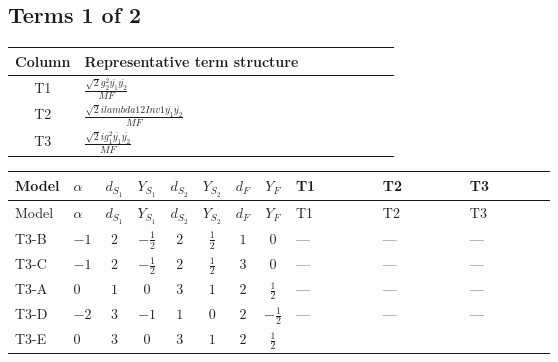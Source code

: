 \documentclass[8pt]{article}
\begin{document}
\begin{landscape}
\subsection*{Terms 1 of 2}
\begin{center}
\begin{tabular}{@{}c >{\raggedright\arraybackslash}p{0.82\linewidth}@{}}
\toprule
Column & Representative term structure \\
\midrule
T1 & \(\displaystyle \frac{\sqrt{2} g_{2}^{2} \overline{y_{1}} \overline{y_{2}}}{MF}\) \\
\midrule
T2 & \(\displaystyle \frac{\sqrt{2} i lambda12Inv1 \overline{y_{1}} \overline{y_{2}}}{MF}\) \\
\midrule
T3 & \(\displaystyle \frac{\sqrt{2} i g_{1}^{2} \overline{y_{1}} \overline{y_{2}}}{MF}\) \\
\midrule
\bottomrule
\end{tabular}
\end{center}
\smallskip
\tiny
\begin{longtable}{@{}llcccccc >{\raggedright\arraybackslash}p{0.21\linewidth} >{\raggedright\arraybackslash}p{0.21\linewidth} >{\raggedright\arraybackslash}p{0.21\linewidth}@{}}
\toprule
Model & $\alpha$ & $d_{S_1}$ & $Y_{S_1}$ & $d_{S_2}$ & $Y_{S_2}$ & $d_F$ & $Y_F$ & T1 & T2 & T3 \\
\midrule
\endfirsthead
\toprule
Model & $\alpha$ & $d_{S_1}$ & $Y_{S_1}$ & $d_{S_2}$ & $Y_{S_2}$ & $d_F$ & $Y_F$ & T1 & T2 & T3 \\
\midrule
\endhead
T3-B & $-1$ & $2$ & $-\frac{1}{2}$ & $2$ & $\frac{1}{2}$ & $1$ & $0$ & --- & --- & --- \\
\midrule
T3-C & $-1$ & $2$ & $-\frac{1}{2}$ & $2$ & $\frac{1}{2}$ & $3$ & $0$ & --- & --- & --- \\
\midrule
T3-A & $0$ & $1$ & $0$ & $3$ & $1$ & $2$ & $\frac{1}{2}$ & --- & --- & --- \\
\midrule
T3-D & $-2$ & $3$ & $-1$ & $1$ & $0$ & $2$ & $-\frac{1}{2}$ & --- & --- & --- \\
\midrule
T3-E & $0$ & $3$ & $0$ & $3$ & $1$ & $2$ & $\frac{1}{2}$ & \scriptsize\adjustbox{max width=\linewidth}{$\begin{gathered} \frac{\sqrt{2} g_{2}^{2} \overline{y_{1}} \overline{y_{2}}}{4 MF}\end{gathered}$} & \scriptsize\adjustbox{max width=\linewidth}{$\begin{gathered} - \frac{\sqrt{2} i lambda12Inv1 \overline{y_{1}} \overline{y_{2}}}{4 MF}\end{gathered}$} & \scriptsize\adjustbox{max width=\linewidth}{$\begin{gathered} \frac{3 \sqrt{2} i g_{1}^{2} \overline{y_{1}} \overline{y_{2}}}{16 MF}\end{gathered}$} \\
\midrule
\bottomrule
\end{longtable}
\clearpage

\end{landscape}
\end{document}
